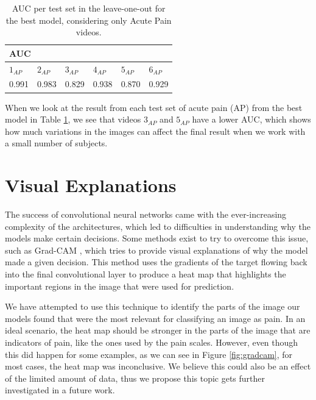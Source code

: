\begin{table}[h!tp]
\centering
\caption{AUC per test set in the leave-one-out for the best model, considering only Acute Pain videos.}
\label{tab:auc_leave_one_out}
\begin{tabular}{llllll}
\hline
\multicolumn{6}{l}{AUC} \\ \hline
\multicolumn{1}{l|}{$1_{AP}$}    & \multicolumn{1}{l|}{$2_{AP}$}    & \multicolumn{1}{l|}{$3_{AP}$}    & \multicolumn{1}{l|}{$4_{AP}$}    & \multicolumn{1}{l|}{$5_{AP}$}    & $6_{AP}$   \\ \hline
\multicolumn{1}{l|}{0.991} & \multicolumn{1}{l|}{0.983} & \multicolumn{1}{l|}{0.829} & \multicolumn{1}{l|}{0.938} & \multicolumn{1}{l|}{0.870} & 0.929 \\ \hline
\end{tabular}
\end{table}

When we look at the result from each test set of acute pain (AP) from the best model in Table \ref{tab:auc_leave_one_out}, we see that videos $3_{AP}$ and $5_{AP}$ have a lower AUC, which shows how much variations in the images can affect the final result when we work with a small number of subjects.

\section{Visual Explanations}

The success of convolutional neural networks came with the ever-increasing complexity of the architectures, which led to difficulties in understanding why the models make certain decisions. Some methods exist to try to overcome this issue, such as Grad-CAM \citep{SelvarajuCDVPB17}, which tries to provide visual explanations of why the model made a given decision. This method uses the gradients of the target flowing back into the final convolutional layer to produce a heat map that highlights the important regions in the image that were used for prediction.

We have attempted to use this technique to identify the parts of the image our models found that were the most relevant for classifying an image as pain. In an ideal scenario, the heat map should be stronger in the parts of the image that are indicators of pain, like the ones used by the pain scales. However, even though this did happen for some examples, as we can see in Figure \ref{fig:gradcam}, for most cases, the heat map was inconclusive. We believe this could also be an effect of the limited amount of data, thus we propose this topic gets further investigated in a future work.

